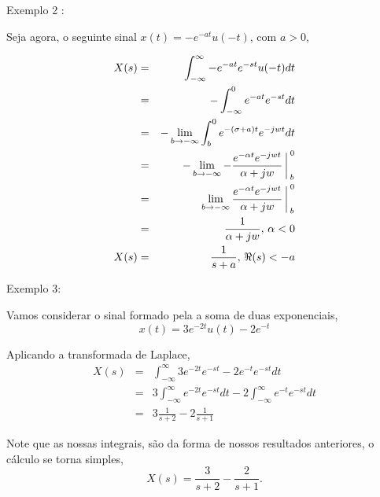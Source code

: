 \documentclass[9pt]{beamer}
\begin{document}
\begin{frame}
  \justifying
  Exemplo 2 : 
  \par
  Seja agora, o seguinte sinal $ x(t) =  -e^{-at} u(-t) $, com $ a > 0 $, 
  \par
  \begin{eqnarray}
	X(s) & =  & \int_{-\infty}^{\infty} - e^{-at} e^{-st} u(-t) dt  \nonumber \\ 
	   & = & - \int_{-\infty}^{0} e^{-at} e^{-st} dt  \nonumber \\ 
	   & = & - \lim_{b\rightarrow -\infty} {\int_{b}^{0} e^{-(\sigma + a)t} e^{-jwt}} dt \nonumber \\ 
	   & = & - \lim_{b\rightarrow -\infty} {-\frac {e^{- \alpha t} e^{ -jwt}} {\alpha + jw} \bigg  \arrowvert_{b}^{0}} \nonumber \\ 
	   & = &  \lim_{b\rightarrow -\infty} {\frac {e^{- \alpha t} e^{ -jwt}} {\alpha + jw} \bigg  \arrowvert_{b}^{0}} \nonumber \\ 
	   & = &  \frac {1} {\alpha + jw}, \nonumber \, \alpha < 0  \\ 
	   X(s) & = &  \frac {1} {s + a}, \nonumber \, \Re(s) <  -a
  \end{eqnarray}
\end{frame}
\begin{frame}
  \justifying
 Exemplo 3:
 \par
 Vamos considerar  o sinal formado pela a soma de duas exponenciais,
 $$ x(t) = 3e^{-2t}u(t) - 2e^{-t} $$
 \par
 Aplicando a transformada de Laplace,
 \begin{eqnarray}
   X(s) & = & \int_{-\infty}^{\infty} 3e^{-2t}e^{-st} - 2e^{-t}e^{-st} dt \nonumber \\ 
   & = & 3 \int_{-\infty}^{\infty} e^{-2t}e^{-st} dt -2 \int_{-\infty}^{\infty} e^{-t}e^{-st} dt  \nonumber \\	
   & = & 3 \frac {1} {s + 2} - 2 \frac {1} {s + 1} \nonumber
 \end{eqnarray}
 \par
 Note que  as nossas integrais, s\~{a}o da forma de nossos resultados anteriores, o c\'{a}lculo se torna simples,
 $$X(s) = \frac {3} {s + 2} - \frac {2} {s + 1}.$$
 \par
 \end{frame}
\end{document}
